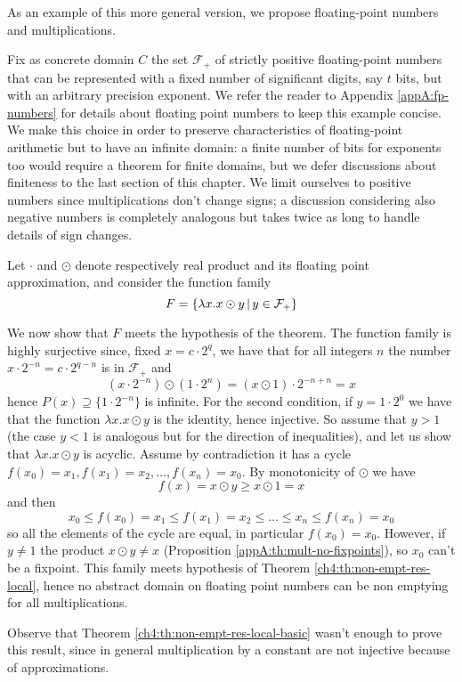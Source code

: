 As an example of this more general version, we propose floating-point numbers and multiplications.
\begin{example}\label{ch4:ex:fp-numbers-local}
	Fix as concrete domain $C$ the set $\mathcal{F_+}$ of strictly positive floating-point numbers that can be represented with a fixed number of significant digits, say $t$ bits, but with an arbitrary precision exponent. We refer the reader to Appendix \ref{appA:fp-numbers} for details about floating point numbers to keep this example concise. We make this choice in order to preserve characteristics of floating-point arithmetic but to have an infinite domain: a finite number of bits for exponents too would require a theorem for finite domains, but we defer discussions about finiteness to the last section of this chapter. We limit ourselves to positive numbers since multiplications don't change signs; a discussion considering also negative numbers is completely analogous but takes twice as long to handle details of sign changes.

	Let $\cdot$ and $\odot$ denote respectively real product and its floating point approximation, and consider the function family
	\[
	F = \{ \lambda x . x \odot y \,\vert\, y \in \mathcal{F_+} \}
	\]

	We now show that $F$ meets the hypothesis of the theorem.
	The function family is highly surjective since, fixed $x = c \cdot 2^q$, we have that for all integers $n$ the number
	$x \cdot 2^{-n} = c \cdot 2^{q-n}$ is in $\mathcal{F_+}$ and
	\[
	(x \cdot 2^{-n}) \odot (1 \cdot 2^{n}) = (x \odot 1) \cdot 2^{-n+n} = x
	\]
	hence $P(x) \supseteq \{ 1 \cdot 2^{-n} \}$ is infinite.
	For the second condition, if $y = 1 \cdot 2^{0}$ we have that the function $\lambda x. x \odot y$ is the identity, hence injective. So assume that $y > 1$ (the case $y < 1$ is analogous but for the direction of inequalities), and let us show that $\lambda x. x \odot y$ is acyclic. Assume by contradiction it has a cycle $f(x_0) = x_1, f(x_1) = x_2, \dots, f(x_n) = x_0$. By monotonicity of $\odot$ we have
	\[
	f(x) = x \odot y \ge x \odot 1 = x
	\]
	and then
	\[
	x_0 \le f(x_0) = x_1 \le f(x_1) = x_2 \le \dots \le x_n \le f(x_n) = x_0
	\]
	so all the elements of the cycle are equal, in particular $f(x_0) = x_0$. However, if $y \neq 1$ the product $x \odot y \neq x$ (Proposition \ref{appA:th:mult-no-fixpoints}), so $x_0$ can't be a fixpoint.
	This family meets hypothesis of Theorem \ref{ch4:th:non-empt-res-local}, hence no abstract domain on floating point numbers can be non emptying for all multiplications.

	Observe that Theorem \ref{ch4:th:non-empt-res-local-basic} wasn't enough to prove this result, since in general multiplication by a constant are not injective because of approximations.
\end{example}

